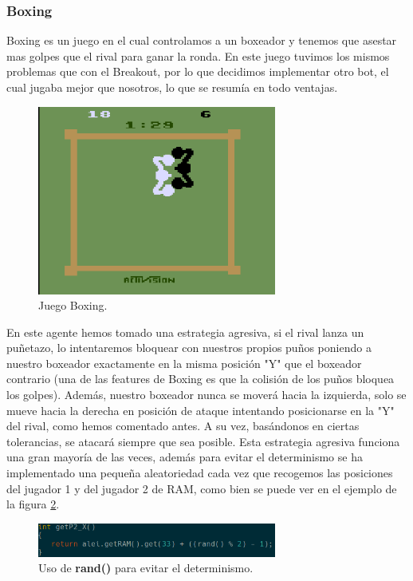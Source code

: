 \subsubsection{Boxing}
\label{subsec:botsbasicos:boxing}
Boxing es un juego en el cual controlamos a un boxeador y tenemos que asestar mas golpes que el rival para ganar la ronda. En este juego tuvimos los mismos problemas que con el Breakout, por lo que decidimos implementar otro bot, el cual jugaba mejor que nosotros, lo que se resumía en todo ventajas.

\begin{figure}[h]
	\centering
	\includegraphics[width=0.7\textwidth]{Figures/boxing}
	\caption{Juego Boxing.}
	\label{fig:boxing}
\end{figure}

En este agente hemos tomado una estrategia agresiva, si el rival lanza un puñetazo, lo intentaremos bloquear con nuestros propios puños poniendo a nuestro boxeador exactamente en la misma posición "Y" que el boxeador contrario (una de las features de Boxing es que la colisión de los puños bloquea los golpes). Además, nuestro boxeador nunca se moverá hacia la izquierda, solo se mueve hacia la derecha en posición de ataque intentando posicionarse en la "Y" del rival, como hemos comentado antes. A su vez, basándonos en ciertas tolerancias, se atacará siempre que sea posible. Esta estrategia agresiva funciona una gran mayoría de las veces, además para evitar el determinismo se ha implementado una pequeña aleatoriedad cada vez que recogemos las posiciones del jugador 1 y del jugador 2 de RAM, como bien se puede ver en el ejemplo de la figura \ref{fig:boxingAleatoriedad}.

\begin{figure}[h]
	\centering
	\includegraphics[width=0.7\textwidth]{Figures/boxingAleatoriedad}
	\caption{Uso de \textbf{rand()} para evitar el determinismo.}
	\label{fig:boxingAleatoriedad}
\end{figure}

